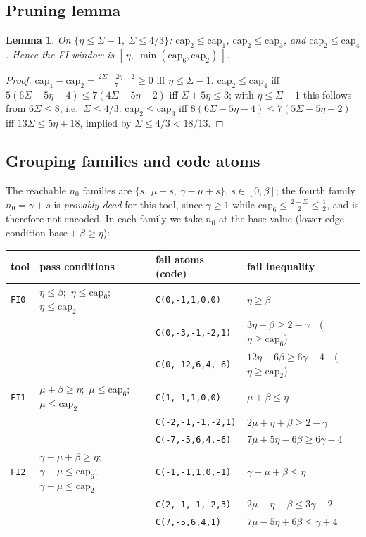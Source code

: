 \documentclass[11pt]{article}
\newtheorem{lemma}{Lemma}[section]
\theoremstyle{remark}
\newcommand{\code}[1]{\texttt{#1}}
\begin{document}
\subsection{Pruning lemma}\label{ssec:pruning}
\begin{lemma}
On $\{\eta\le\Sigma-1,\ \Sigma\le4/3\}$:
$\mathrm{cap}_2\le\mathrm{cap}_1$,
$\mathrm{cap}_2\le\mathrm{cap}_3$, and
$\mathrm{cap}_2\le\mathrm{cap}_4$. Hence the FI window is
$[\,\eta,\ \min(\mathrm{cap}_6,\mathrm{cap}_2)\,]$.
\end{lemma}
\begin{proof}
$\mathrm{cap}_1-\mathrm{cap}_2=\tfrac{2\Sigma-2\eta-2}{7}\ge0$ iff
$\eta\le\Sigma-1$.
$\mathrm{cap}_2\le\mathrm{cap}_4$ iff $5(6\Sigma-5\eta-4)\le
7(4\Sigma-5\eta-2)$ iff $\Sigma+5\eta\le3$; with $\eta\le\Sigma-1$ this
follows from $6\Sigma\le8$, i.e.\ $\Sigma\le4/3$.
$\mathrm{cap}_2\le\mathrm{cap}_3$ iff $8(6\Sigma-5\eta-4)\le
7(5\Sigma-5\eta-2)$ iff $13\Sigma\le5\eta+18$, implied by
$\Sigma\le4/3<18/13$.
\end{proof}

\subsection{Grouping families and code atoms}
The reachable $n_0$ families are $\{s,\ \mu+s,\ \gamma-\mu+s\}$,
$s\in[0,\beta]$; the fourth family $n_0=\gamma+s$ is \emph{provably
dead} for this tool, since $\gamma\ge1$ while
$\mathrm{cap}_6\le\tfrac{2-\Sigma}{2}\le\tfrac12$, and is therefore not
encoded. In each family we take $n_0$ at the base value (lower edge
condition base${}+\beta\ge\eta$):

\begin{center}
\small
\begin{tabular}{@{}llll@{}}
\toprule
tool & pass conditions & fail atoms (code) & fail inequality\\
\midrule
\code{FI0} & $\eta\le\beta$;\ $\eta\le\mathrm{cap}_6$;\ $\eta\le\mathrm{cap}_2$
 & \code{C(0,-1,1,0,0)} & $\eta\ge\beta$\\
 & & \code{C(0,-3,-1,-2,1)} & $3\eta+\beta\ge2-\gamma$\ \ ($\eta\ge\mathrm{cap}_6$)\\
 & & \code{C(0,-12,6,4,-6)} & $12\eta-6\beta\ge6\gamma-4$\ \ ($\eta\ge\mathrm{cap}_2$)\\
\code{FI1} & $\mu+\beta\ge\eta$;\ $\mu\le\mathrm{cap}_6$;\ $\mu\le\mathrm{cap}_2$
 & \code{C(1,-1,1,0,0)} & $\mu+\beta\le\eta$\\
 & & \code{C(-2,-1,-1,-2,1)} & $2\mu+\eta+\beta\ge2-\gamma$\\
 & & \code{C(-7,-5,6,4,-6)} & $7\mu+5\eta-6\beta\ge6\gamma-4$\\
\code{FI2} & $\gamma-\mu+\beta\ge\eta$;\ $\gamma-\mu\le\mathrm{cap}_6$;\
$\gamma-\mu\le\mathrm{cap}_2$
 & \code{C(-1,-1,1,0,-1)} & $\gamma-\mu+\beta\le\eta$\\
 & & \code{C(2,-1,-1,-2,3)} & $2\mu-\eta-\beta\le3\gamma-2$\\
 & & \code{C(7,-5,6,4,1)} & $7\mu-5\eta+6\beta\le\gamma+4$\\
\bottomrule
\end{tabular}
\end{center}
\end{document}
